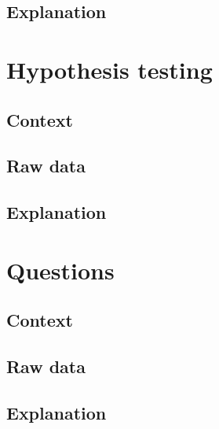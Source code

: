 \subsection{Explanation}

\section{Hypothesis testing}

\subsection{Context}
\subsection{Raw data}
\subsection{Explanation}

\section{Questions}

\subsection{Context}
\subsection{Raw data}
\subsection{Explanation}